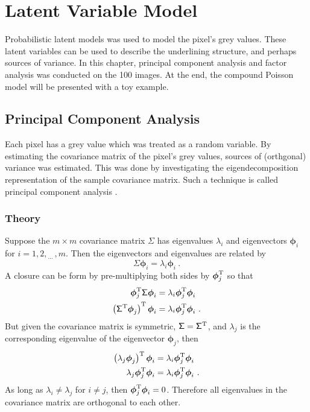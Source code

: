 \documentclass[12pt]{report}
\newcommand{\T}{^\textup{T}}
\newcommand{\dotdotdot}{_{\phantom{.}\cdots}}
\newcommand{\vectGreek}[1]{\boldsymbol{#1}}
\newcommand{\matr}[1]{\mathsf{#1}}
\begin{document}
\chapter{Latent Variable Model}
Probabilistic latent models was used to model the pixel's grey values. These latent variables can be used to describe the underlining structure, and perhaps sources of variance. In this chapter, principal component analysis and factor analysis was conducted on the 100 images. At the end, the compound Poisson model will be presented with a toy example.

\section{Principal Component Analysis}
Each pixel has a grey value which was treated as a random variable. By estimating the covariance matrix of the pixel's grey values, sources of (orthgonal) variance was estimated. This was done by investigating the eigendecomposition representation of the sample covariance matrix. Such a technique is called principal component analysis \cite[pp.~329-330]{barber2012bayesian}.

\subsection{Theory}
Suppose the $m\times m$ covariance matrix $\matr{\Sigma}$ has eigenvalues $\lambda_i$ and eigenvectors $\vectGreek{\phi}_i$ for $i=1,2,\dotdotdot,m$. Then the eigenvectors and eigenvalues are related by
\begin{equation}
\matr{\Sigma}\vectGreek{\phi}_i = \lambda_i\vectGreek{\phi}_i \ .
\label{eq:eigenvector_eigenvalue_forCovariance}
\end{equation}
A closure can be form by pre-multiplying both sides by $\vectGreek{\phi}_j\T$ so that
\begin{align*}
\vectGreek{\phi}_j\T \matr{\Sigma}\vectGreek{\phi}_i &= \lambda_i\vectGreek{\phi}_j\T\vectGreek{\phi}_i \\
\left(\matr{\Sigma}\T \vectGreek{\phi}_j \right)\T\vectGreek{\phi}_i &= \lambda_i\vectGreek{\phi}_j\T\vectGreek{\phi}_i \ .
\end{align*}
But given the covariance matrix is symmetric, $\matr{\Sigma}=\matr{\Sigma}\T$, and $\lambda_j$ is the corresponding eigenvalue of the eigenvector $\vectGreek{\phi}_j$, then
\begin{align*}
\left(\lambda_j\vectGreek{\phi}_j \right)\T\vectGreek{\phi}_i &= \lambda_i\vectGreek{\phi}_j\T\vectGreek{\phi}_i \\
\lambda_j\vectGreek{\phi}_j\T\vectGreek{\phi}_i &= \lambda_i\vectGreek{\phi}_j\T\vectGreek{\phi}_i \ .
\end{align*}
As long as $\lambda_i\neq\lambda_j$ for $i\neq j$, then $\vectGreek{\phi}_j\T\vectGreek{\phi}_i=0$. Therefore all eigenvalues in the covariance matrix are orthogonal to each other.
\end{document}
